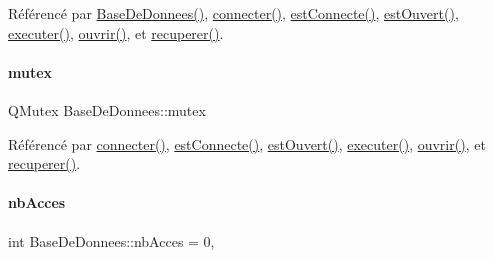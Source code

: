 Référencé par \hyperlink{class_base_de_donnees_a10dd177f1008f675ab78c2221b2a6750}{Base\+De\+Donnees()}, \hyperlink{class_base_de_donnees_ac20da193923a9bfea5e38ee5a54820cd}{connecter()}, \hyperlink{class_base_de_donnees_a00388973f3ec42e5c8e76e7af7e124b2}{est\+Connecte()}, \hyperlink{class_base_de_donnees_af9ac332082ffd0dd35e412cefabe5e9c}{est\+Ouvert()}, \hyperlink{class_base_de_donnees_aa8de5f8f8bb17edc43f5c0ee33712081}{executer()}, \hyperlink{class_base_de_donnees_a7f6a5510b08017b0d99115a84252f186}{ouvrir()}, et \hyperlink{class_base_de_donnees_a77539baad389f5acf754cd2cd452403e}{recuperer()}.

\mbox{\label{class_base_de_donnees_aa1b4696fac87a740f914aa73739086f2}} 
\paragraph{\texorpdfstring{mutex}{mutex}}
{\footnotesize\ttfamily Q\+Mutex Base\+De\+Donnees\+::mutex\hspace{0.3cm}{\ttfamily [private]}}



Référencé par \hyperlink{class_base_de_donnees_ac20da193923a9bfea5e38ee5a54820cd}{connecter()}, \hyperlink{class_base_de_donnees_a00388973f3ec42e5c8e76e7af7e124b2}{est\+Connecte()}, \hyperlink{class_base_de_donnees_af9ac332082ffd0dd35e412cefabe5e9c}{est\+Ouvert()}, \hyperlink{class_base_de_donnees_aa8de5f8f8bb17edc43f5c0ee33712081}{executer()}, \hyperlink{class_base_de_donnees_a7f6a5510b08017b0d99115a84252f186}{ouvrir()}, et \hyperlink{class_base_de_donnees_a77539baad389f5acf754cd2cd452403e}{recuperer()}.

\mbox{\label{class_base_de_donnees_a5099ecb2922bb31d84cd5d4505298a29}} 
\paragraph{\texorpdfstring{nb\+Acces}{nbAcces}}
{\footnotesize\ttfamily int Base\+De\+Donnees\+::nb\+Acces = 0\hspace{0.3cm}{\ttfamily [static]}, {\ttfamily [private]}}



